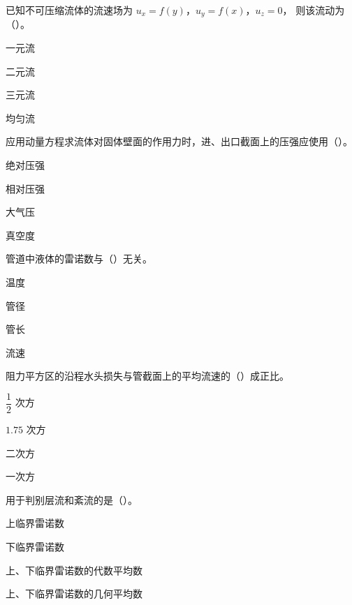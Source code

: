\begin{ti}
  \item 已知不可压缩流体的流速场为 \(u_x=f(y)\)，\(u_y=f(x)\)，\(u_z=0\)，
  则该流动为（\quad）。\hfill{}
  \begin{choices}
    \item 一元流
    \item 二元流
    \item 三元流
    \item 均匀流
  \end{choices}

  \item 应用动量方程求流体对固体壁面的作用力时，进、出口截面上的压强应使用（\quad）。
  \hfill{}
  \begin{choices}
    \item 绝对压强
    \item 相对压强
    \item 大气压
    \item 真空度
  \end{choices}

  \item 管道中液体的雷诺数与（\quad）无关。\hfill{}
  \begin{choices}
    \item 温度
    \item 管径
    \item 管长
    \item 流速
  \end{choices}

  \item 阻力平方区的沿程水头损失与管截面上的平均流速的（\quad）成正比。\hfill{}
  \begin{choices}
    \item \(\dfrac{1}{2}\) 次方
    \item \(1.75\) 次方
    \item 二次方
    \item 一次方
  \end{choices}

  \item 用于判别层流和紊流的是（\quad）。\hfill{}
  \begin{choices}
    \item 上临界雷诺数
    \item 下临界雷诺数
    \item 上、下临界雷诺数的代数平均数
    \item 上、下临界雷诺数的几何平均数
  \end{choices}


\end{ti}
